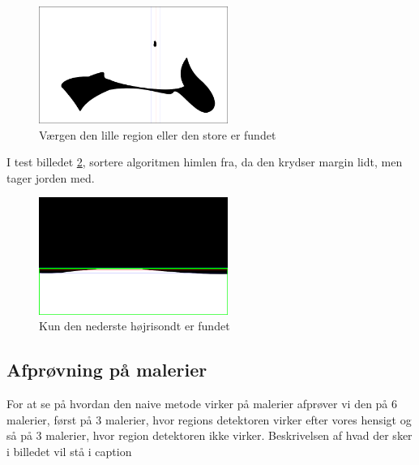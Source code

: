 \begin{figure}[!h]
	\begin{center}
       	\includegraphics[angle=0,width=0.55\textwidth]{afsnit/afprovning/billeder/naive_losning/naiv_blob2.png}
	\end{center}
	\caption{Værgen den lille region eller den store er fundet} 
   	\label{naiv_blob2}
\end{figure}

I test billedet \ref{naive_hoisont1}, sortere algoritmen
himlen fra, da den krydser margin lidt, men tager jorden med. 

\begin{figure}[!h]
	\begin{center}
       	\includegraphics[angle=0,width=0.55\textwidth]{afsnit/afprovning/billeder/naive_losning/naiv_hoisont1.png}
	\end{center}
	\caption{Kun den nederste højrisondt er fundet} 
   	\label{naive_hoisont1}
\end{figure}

\clearpage

\subsection{Afprøvning på malerier}
For at se på hvordan den naive metode virker på malerier afprøver vi den
på 6 malerier, først på 3 malerier, hvor regions detektoren virker
efter vores hensigt og så på 3 malerier, hvor region detektoren ikke
virker. Beskrivelsen af hvad der sker i billedet vil stå i caption



